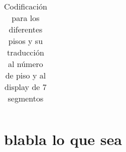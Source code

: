 \begin{appendices}
\begin{table}[H]
\begin{tabular}{|c|c|}
			\end{tabular}
			\caption{ Codificación para los diferentes pisos y su traducción  al número de piso y al display de 7 segmentos }
			\label{tab:tabla2ApendiceA}
		\end{table}
		
		
		
	\newpage	
    \section{blabla lo que sea} \label{app:bar}
\end{appendices}